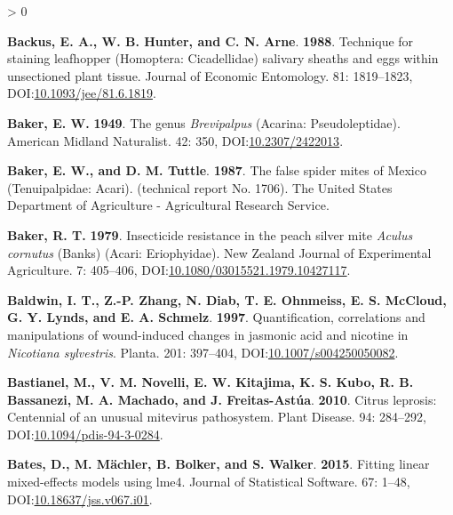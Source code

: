 \documentclass{ufdissertation}[overrideChapters] %
\newlength{\cslhangindent}
\newenvironment{CSLReferences}[2] %
 {%
  \setlength{\parindent}{0pt}
  \ifodd #1 \everypar{\setlength{\hangindent}{\cslhangindent}}\ignorespaces\fi
  \ifnum #2 > 0
  \setlength{\parskip}{#2\baselineskip}
  \fi
 }%
 {}
\begin{document}
{\begin{CSLReferences}{1}{1}
\leavevmode{}%
\textbf{Backus, E. A., W. B. Hunter, and C. N. Arne}. \textbf{1988}. Technique for staining leafhopper ({Homoptera}: {Cicadellidae}) salivary sheaths and eggs within unsectioned plant tissue. Journal of Economic Entomology. 81: 1819--1823, DOI:\href{https://doi.org/10.1093/jee/81.6.1819}{10.1093/jee/81.6.1819}.

\leavevmode{}%
\textbf{Baker, E. W.} \textbf{1949}. The genus {\emph{Brevipalpus}} ({Acarina}: {Pseudoleptidae}). American Midland Naturalist. 42: 350, DOI:\href{https://doi.org/10.2307/2422013}{10.2307/2422013}.

\leavevmode{}%
\textbf{Baker, E. W., and D. M. Tuttle}. \textbf{1987}. The false spider mites of {Mexico} ({Tenuipalpidae}: {Acari}). (technical report No. 1706). The {United States} Department of Agriculture - Agricultural Research Service.

\leavevmode{}%
\textbf{Baker, R. T.} \textbf{1979}. Insecticide resistance in the peach silver mite {\emph{Aculus cornutus}} {(Banks)} ({Acari}: {Eriophyidae}). New Zealand Journal of Experimental Agriculture. 7: 405--406, DOI:\href{https://doi.org/10.1080/03015521.1979.10427117}{10.1080/03015521.1979.10427117}.

\leavevmode{}%
\textbf{Baldwin, I. T., Z.-P. Zhang, N. Diab, T. E. Ohnmeiss, E. S. McCloud, G. Y. Lynds, and E. A. Schmelz}. \textbf{1997}. Quantification, correlations and manipulations of wound-induced changes in jasmonic acid and nicotine in {\emph{Nicotiana sylvestris}}. Planta. 201: 397--404, DOI:\href{https://doi.org/10.1007/s004250050082}{10.1007/s004250050082}.

\leavevmode{}%
\textbf{Bastianel, M., V. M. Novelli, E. W. Kitajima, K. S. Kubo, R. B. Bassanezi, M. A. Machado, and J. Freitas-Astúa}. \textbf{2010}. {Citrus leprosis}: Centennial of an unusual mite{\textendash}virus pathosystem. Plant Disease. 94: 284--292, DOI:\href{https://doi.org/10.1094/pdis-94-3-0284}{10.1094/pdis-94-3-0284}.

\leavevmode{}%
\textbf{Bates, D., M. Mächler, B. Bolker, and S. Walker}. \textbf{2015}. Fitting linear mixed-effects models using {lme4}. Journal of Statistical Software. 67: 1--48, DOI:\href{https://doi.org/10.18637/jss.v067.i01}{10.18637/jss.v067.i01}.


\end{CSLReferences}}
\end{document}

